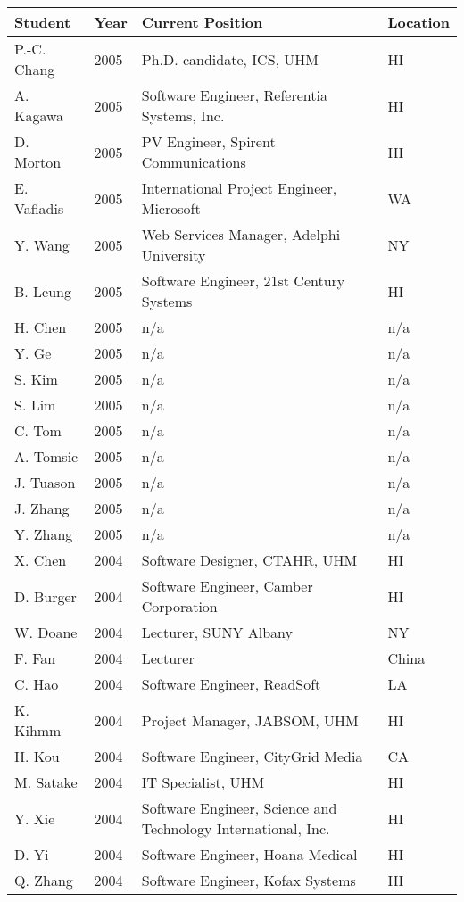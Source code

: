 \documentclass[12pt]{article}
\begin{document}
\begin{table}[Htb]
\begin{tabular}{|l|l|l|l|}
\hline
Student & Year & Current Position & Location \\
\hline
P.-C. Chang & 2005 & Ph.D. candidate, ICS, UHM & HI\\
A. Kagawa   & 2005 & Software Engineer, Referentia Systems, Inc. & HI\\
D. Morton   & 2005 & PV Engineer, Spirent Communications & HI\\
E. Vafiadis & 2005 & International Project Engineer, Microsoft & WA\\
Y. Wang     & 2005 & Web Services Manager, Adelphi University & NY\\
B. Leung    & 2005 & Software Engineer, 21st Century Systems & HI\\
H. Chen     & 2005 & n/a & n/a\\
Y. Ge       & 2005 & n/a & n/a\\
S. Kim      & 2005 & n/a & n/a\\
S. Lim      & 2005 & n/a & n/a\\
C. Tom      & 2005 & n/a & n/a\\
A. Tomsic   & 2005 & n/a & n/a\\
J. Tuason   & 2005 & n/a & n/a\\
J. Zhang    & 2005 & n/a & n/a\\
Y. Zhang    & 2005 & n/a & n/a\\
\hline
X. Chen     & 2004 & Software Designer, CTAHR, UHM & HI\\
D. Burger   & 2004 & Software Engineer, Camber Corporation & HI\\
W. Doane    & 2004 & Lecturer, SUNY Albany & NY\\
F. Fan      & 2004 & Lecturer & China\\
C. Hao      & 2004 & Software Engineer, ReadSoft & LA\\
K. Kihmm    & 2004 & Project Manager, JABSOM, UHM & HI\\
H. Kou      & 2004 & Software Engineer, CityGrid Media &  CA\\
M. Satake   & 2004 & IT Specialist, UHM & HI\\
Y. Xie      & 2004 & Software Engineer, Science and Technology International, Inc. & HI\\
D. Yi       & 2004 & Software Engineer, Hoana Medical & HI\\
Q. Zhang    & 2004 & Software Engineer, Kofax Systems & HI\\

\end{tabular}
\end{table}
\end{document}
